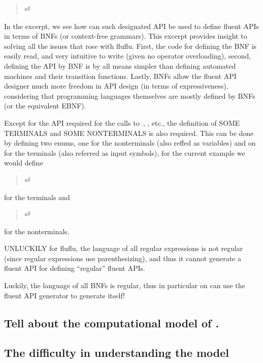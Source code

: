 \begin{quote}
  \parbox[c]{53ex}{}⏎
\end{quote}

In the excerpt, we see how can such designated API be used to define fluent
APIs in terms of BNFs (or context-free grammars).  This excerpt provides
insight to solving all the issues that rose with fluflu.  First, the code for
defining the BNF is easily read, and very intuitive to write (given no operator
overloading), second, defining the API by BNF is by all means simpler than
defining automated machines and their transition functions.  Lastly, BNFs allow
the fluent API designer much more freedom in API design (in terms of
expressiveness), considering that programming languages themselves are mostly
defined by BNFs (or the equivalent EBNF).

Except for the API required for the calls to~, ,  etc.,
  the definition of SOME TERMINALS and SOME NONTERMINALS is also required.
  This can be done by defining two \Java enums, one for the nonterminals (also reffed as variables) 
  and on for the terminals (also referred as input symbols), for the current example we would define
  
\begin{quote}
  \parbox[c]{53ex}{}⏎
\end{quote}

 for the terminals and 

\begin{quote}
  \parbox[c]{53ex}{}⏎
\end{quote}

for the nonterminals.

UNLUCKILY for fluflu,  the language of all regular expressions is not 
regular (since regular expressions use parenthesizing), and thus it 
cannot generate a fluent API for defining ``regular'' fluent APIs.

Luckily, the language of all BNFs is regular, thus in particular
  on can use the fluent API generator to generate itself!

\subsection{Tell about the computational model of \CC.}

\subsection{The difficulty in understanding the \Java model}

